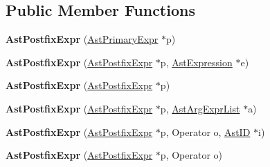 \subsection*{Public Member Functions}
\begin{DoxyCompactItemize}
\item 
\hypertarget{classAstPostfixExpr_a8299517f87239b0428545cdfc96f0bbc}{{\bfseries Ast\-Postfix\-Expr} (\hyperlink{classAstPrimaryExpr}{Ast\-Primary\-Expr} $\ast$p)}\label{classAstPostfixExpr_a8299517f87239b0428545cdfc96f0bbc}

\item 
\hypertarget{classAstPostfixExpr_a5dd762cbae8160f94a661ecdf3a90770}{{\bfseries Ast\-Postfix\-Expr} (\hyperlink{classAstPostfixExpr}{Ast\-Postfix\-Expr} $\ast$p, \hyperlink{classAstExpression}{Ast\-Expression} $\ast$e)}\label{classAstPostfixExpr_a5dd762cbae8160f94a661ecdf3a90770}

\item 
\hypertarget{classAstPostfixExpr_af17b325f38a7138728773d86a9342105}{{\bfseries Ast\-Postfix\-Expr} (\hyperlink{classAstPostfixExpr}{Ast\-Postfix\-Expr} $\ast$p)}\label{classAstPostfixExpr_af17b325f38a7138728773d86a9342105}

\item 
\hypertarget{classAstPostfixExpr_a4a1ae7a03b7b29e6641f47479e58aa3b}{{\bfseries Ast\-Postfix\-Expr} (\hyperlink{classAstPostfixExpr}{Ast\-Postfix\-Expr} $\ast$p, \hyperlink{classAstArgExprList}{Ast\-Arg\-Expr\-List} $\ast$a)}\label{classAstPostfixExpr_a4a1ae7a03b7b29e6641f47479e58aa3b}

\item 
\hypertarget{classAstPostfixExpr_a094735e6e2f593a42cc2b9aabc44213b}{{\bfseries Ast\-Postfix\-Expr} (\hyperlink{classAstPostfixExpr}{Ast\-Postfix\-Expr} $\ast$p, Operator o, \hyperlink{classAstID}{Ast\-I\-D} $\ast$i)}\label{classAstPostfixExpr_a094735e6e2f593a42cc2b9aabc44213b}

\item 
\hypertarget{classAstPostfixExpr_a71f3baa5264259031d95741e65de1e07}{{\bfseries Ast\-Postfix\-Expr} (\hyperlink{classAstPostfixExpr}{Ast\-Postfix\-Expr} $\ast$p, Operator o)}\label{classAstPostfixExpr_a71f3baa5264259031d95741e65de1e07}


\end{DoxyCompactItemize}
